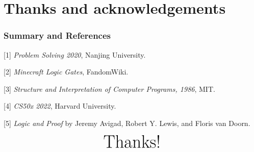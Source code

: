 \documentclass[11pt]{beamer}
\begin{document}
	\section*{Thanks and acknowledgements}


	\begin{frame}
		\frametitle{Summary and References}
	
		[1] \textit{Problem Solving 2020}, Nanjing University.
		
		[2] \textit{Minecraft Logic Gates}, FandomWiki.

		[3] \textit{Structure and Interpretation of Computer Programs, 1986}, MIT.
		
		[4] \textit{CS50x 2022}, Harvard University.
		
		[5] \textit{Logic and Proof} by Jeremy Avigad, Robert Y. Lewis, and Floris van Doorn.
	
	\end{frame}

	\begin{frame}
		
		$$\Huge \text{Thanks!}$$
	\end{frame}
	
\end{document}
